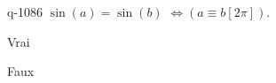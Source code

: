 \begin{truefalse}{q-1086}
$\sin(a)=\sin(b)$  $\Leftrightarrow \left(a\equiv b [2\pi]\right)$.
\item Vrai
\item* Faux
\end{truefalse}

